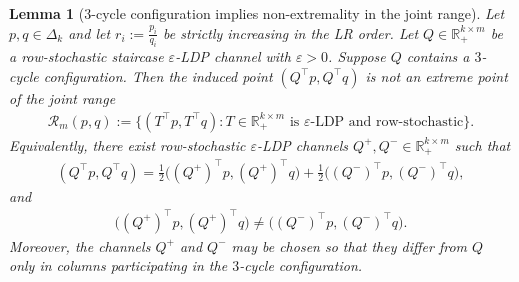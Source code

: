 \documentclass{article}
\theoremstyle{plain}
\newtheorem{lemma}[theorem]{Lemma}
\theoremstyle{definition}
\theoremstyle{plain}
\begin{document}
\begin{lemma}[$3$-cycle configuration implies non-extremality in the joint range]
\label{lemma:3-cycle-implies-non-extremality-in-joint-range}
Let $p,q \in \Delta_k$ and let $r_i := \frac{p_i}{q_i}$ be strictly increasing in the LR order. Let $Q \in \mathbb{R}_+^{k\times m}$ be a row-stochastic staircase $\varepsilon$-LDP channel with $\varepsilon > 0$. Suppose $Q$ contains a $3$-cycle configuration. Then the induced point $(Q^\top p, Q^\top q)$ is not an extreme point of the joint range
\begin{align*}
    \mathcal{R}_m(p,q):=\{(T^\top p,T^\top q): T \in \mathbb{R}_+^{k\times m} \text{ is }\varepsilon\text{-LDP and row-stochastic}\}.
\end{align*}
Equivalently, there exist row-stochastic $\varepsilon$-LDP channels $Q^+,Q^-\in\mathbb{R}_+^{k\times m}$ such that
\begin{align*}
    (Q^\top p,Q^\top q)
    =
    \tfrac12\bigl((Q^+)^\top p,(Q^+)^\top q\bigr)
    +
    \tfrac12\bigl((Q^-)^\top p,(Q^-)^\top q\bigr),
\end{align*}
and
\begin{align*}
    \bigl((Q^+)^\top p,(Q^+)^\top q\bigr)\neq \bigl((Q^-)^\top p,(Q^-)^\top q\bigr).
\end{align*}
Moreover, the channels $Q^+$ and $Q^-$ may be chosen so that they differ from $Q$ only in columns participating in the $3$-cycle configuration.
\end{lemma}
\end{document}
